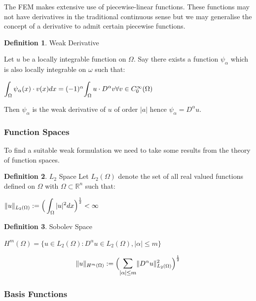 \documentclass{uonmathreport}
\theoremstyle{definition}
\newtheorem{definition}{Definition}[section]
\theoremstyle{problem}
\theoremstyle{theorem}
\begin{document}
The FEM makes extensive use of piecewise-linear functions. These functions may not have derivatives in the traditional continuous sense but we may generalise the concept of a derivative to admit certain piecewise functions.

\begin{definition}{Weak Derivative} \label{def:weak derivative}

Let $u$ be a locally integrable  function on $\Omega$. Say there exists a function $\psi_\alpha$ which is also locally integrable on $\omega$ such that:

$\mathlarger{\int_\Omega  \psi_\alpha(x) \cdot v(x) dx} = (-1)^{\alpha} \mathlarger{\int_\Omega  u \cdot D^{\alpha} v} \forall v \in C^\infty_0(\Omega)$

Then $\psi_\alpha$ is the weak derivative of $u$ of order $|a|$ hence $\psi_\alpha = D^\alpha u$. 
\end{definition}

\subsubsection{Function Spaces} \label{subsec:Function Spaces}

To find a suitable weak formulation we need to take some results from the theory of function spaces.

\begin{definition}{$L_2$ Space}
Let $L_2(\Omega)$ denote the set of all real valued functions defined on $\Omega$ with $\Omega \subset \mathbb{R}^n$ such that:
\begin{center}
$\|u\|_{L_2(\Omega)} := \mathlarger{\Big(\int_\Omega  { |u|^2 } dx\Big)}^{\frac{1}{2}} < \infty$
\end{center}
\end{definition}


\begin{definition}{Sobolev Space}

$H^{m}(\Omega) = \{ u \in L_2(\Omega) : D^{\alpha} u \in L_2(\Omega), |\alpha| \leq m \}$

$$\|u\|_{H^m(\Omega)} :=  \Big(\mathlarger{\sum_{|\alpha|\leq m}}\|D^{\alpha}u\|^2_{L_2(\Omega)} \Big)^{\frac{1}{2}} $$
\end{definition}


\subsubsection{Basis Functions} \label{subsec:basis}
\end{document}
